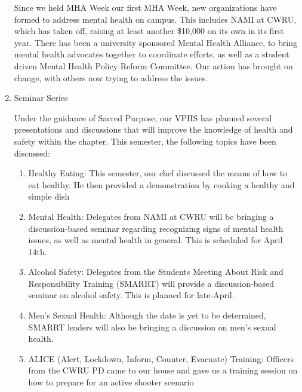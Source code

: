 \begin{enumerate}
  	Since we held MHA Week our first MHA Week, new organizations have formed to address mental health on campus. This includes NAMI at CWRU, which has taken off, raising at least another \$10,000 on its own in its first year. There has been a university sponsored Mental Health Alliance, to bring mental health advocates together to coordinate efforts, as well as a student driven Mental Health Policy Reform Committee. Our action has brought on change, with others now trying to address the issues.
  	
    \item Seminar Series
    
	  Under the guidance of Sacred Purpose, our VPHS has planned several presentations and discussions that will improve the knowledge of health and safety within the chapter. This semester, the following topics have been discussed:	
	  \begin{enumerate}
	    \item Healthy Eating: This semester, our chef discussed the means of how to eat healthy. He then provided a demonstration by cooking a healthy and simple dish
	    \item Mental Health: Delegates from NAMI at CWRU will be bringing a discussion-based seminar regarding recognizing signs of mental health issues, as well as mental health in general. This is scheduled for April 14th.
	    \item Alcohol Safety: Delegates from the Students Meeting About Risk and Responsibility Training (SMARRT) will provide a discussion-based seminar on alcohol safety. This is planned for late-April.
	    \item Men's Sexual Health: Although the date is yet to be determined, SMARRT leaders will also be bringing a discussion on men's sexual health.
	    \item ALICE (Alert, Lockdown, Inform, Counter, Evacuate) Training: Officers from the CWRU PD came to our house and gave us a training session on how to prepare for an active shooter scenario
	\end{enumerate}
 \end{enumerate}